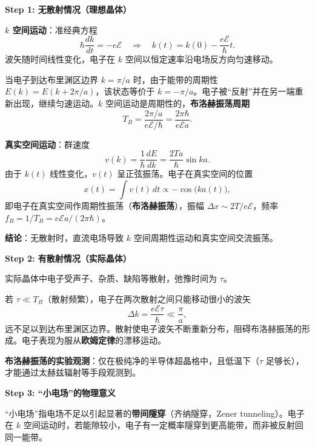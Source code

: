 \begin{derivationbox}[标准解题过程]
\textbf{Step 1: 无散射情况（理想晶体）}

\textbf{$k$ 空间运动}：准经典方程
\begin{equation}
\hbar\frac{dk}{dt}=-e\mathcal{E}
\quad\Longrightarrow\quad
k(t)=k(0)-\frac{e\mathcal{E}}{\hbar}t.
\end{equation}
波矢随时间线性变化，电子在 $k$ 空间以恒定速率沿电场反方向匀速移动。

当电子到达布里渊区边界 $k=\pi/a$ 时，由于能带的周期性 $E(k)=E(k+2\pi/a)$，该状态等价于 $k=-\pi/a$。电子被``反射''并在另一端重新出现，继续匀速运动。$k$ 空间运动是周期性的，\textbf{布洛赫振荡周期}
\begin{equation}
\boxed{T_B=\frac{2\pi/a}{e\mathcal{E}/\hbar}=\frac{2\pi\hbar}{e\mathcal{E}a}.}
\end{equation}

\textbf{真实空间运动}：群速度
\begin{equation}
v(k)=\frac{1}{\hbar}\frac{dE}{dk}=\frac{2Ta}{\hbar}\sin ka.
\end{equation}
由于 $k(t)$ 线性变化，$v(t)$ 呈正弦振荡。电子在真实空间的位置
\begin{equation}
x(t)=\int v(t)\,dt\propto-\cos\bigl(ka(t)\bigr),
\end{equation}
即电子在真实空间作周期性振荡（\textbf{布洛赫振荡}），振幅 $\Delta x\sim 2T/e\mathcal{E}$，频率 $f_B=1/T_B=e\mathcal{E}a/(2\pi\hbar)$。

\textbf{结论}：无散射时，直流电场导致 $k$ 空间周期性运动和真实空间交流振荡。

\textbf{Step 2: 有散射情况（实际晶体）}

实际晶体中电子受声子、杂质、缺陷等散射，弛豫时间为 $\tau$。

若 $\tau\ll T_B$（散射频繁），电子在两次散射之间只能移动很小的波矢
\begin{equation}
\Delta k=\frac{e\mathcal{E}\tau}{\hbar}\ll\frac{\pi}{a},
\end{equation}
远不足以到达布里渊区边界。散射使电子波矢不断重新分布，阻碍布洛赫振荡的形成。电子表现为服从\textbf{欧姆定律}的漂移运动。

\textbf{布洛赫振荡的实验观测}：仅在极纯净的半导体超晶格中，且低温下（$\tau$ 足够长），才能通过太赫兹辐射等手段观测到。

\textbf{Step 3: ``小电场''的物理意义}

``小电场''指电场不足以引起显著的\textbf{带间隧穿}（齐纳隧穿，Zener tunneling）。电子在 $k$ 空间运动时，若能隙较小，电子有一定概率隧穿到更高能带，而非被反射回同一能带。


\end{derivationbox}
